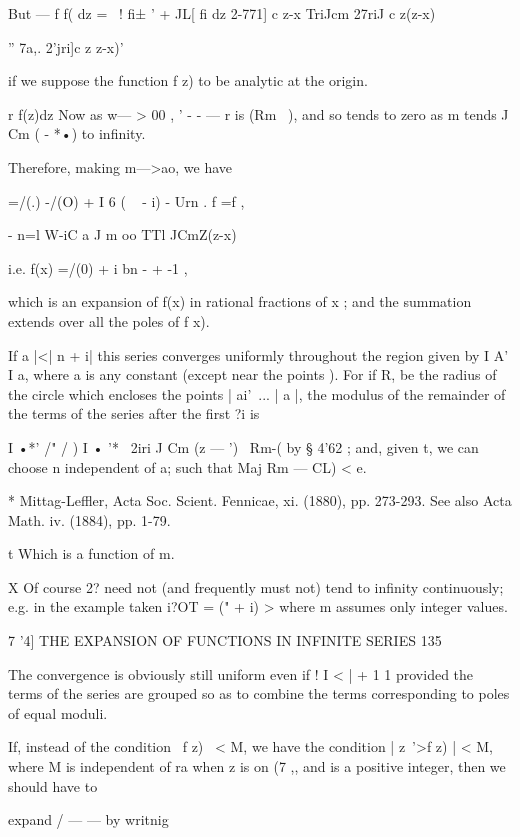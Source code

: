 But — f f( dz = ~! fi± ' + JL[  fi dz 
2-771] c z-x  TriJcm   27riJ c z(z-x) 

  '' 7a,. 2'jri]c z z-x)' 

if we suppose the function f z) to be analytic at the origin. 

r f(z)dz 
Now as w— > 00 , ' - -  — r is (Rm~ ), and so tends to zero as m tends 
J Cm   (  - *•) 
to infinity. 

Therefore, making m—>ao, we have 

=/(.) -/(O) + I 6  ( ~ - i) - Urn  . f =f  , 

-  n=l W-iC a J m oo TTl JCmZ(z-x) 

i.e. f(x) =/(0) + i bn  -  + -1 , 

which is an expansion of f(x) in rational fractions of x ; and the summation 
extends over all the poles of f x). 

If a |<| n + i| this series converges uniformly throughout the region given by 
I A' I   a, where a is any constant (except near the points   ). For if R,  be the radius 
of the circle which encloses the points | ai'\, ... | a  |, the modulus of the remainder of the 
terms of the series after the first ?i is 

I •*' /" /   )   I • '* 
\ 2iri J Cm   (z —  ') \ Rm-(  
by § 4'62 ; and, given t, we can choose n independent of a; such that Maj Rm — CL) < e. 

* Mittag-Leffler, Acta Soc. Scient. Fennicae, xi. (1880), pp. 273-293. See also Acta Math. iv. 
(1884), pp. 1-79. 

t Which is a function of m. 

X Of course 2?  need not (and frequently must not) tend to infinity continuously; e.g. in the 
example taken i?OT = ("  + i)  > where m assumes only integer values. 



7 '4] THE EXPANSION OF FUNCTIONS IN INFINITE SERIES 135 

The convergence is obviously still uniform even if !    I < |    + 1 1 provided the terms of 
the series are grouped so as to combine the terms corresponding to poles of equal moduli. 

If, instead of the condition \ f z) \ < M, we have the condition | z~'>f z) | < M, where M is 
independent of ra when z is on (7 ,, and   is a positive integer, then we should have to 



expand / —  — by writnig 




